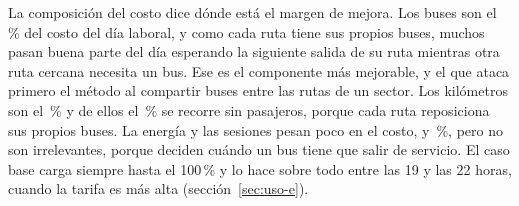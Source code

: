 La composición del costo dice dónde está el margen de mejora. Los buses son el \PctFlotaBaseLaboral\,\% del costo del día laboral, y como cada ruta tiene sus propios buses, muchos pasan buena parte del día esperando la siguiente salida de su ruta mientras otra ruta cercana necesita un bus. Ese es el componente más mejorable, y el que ataca primero el método al compartir buses entre las rutas de un sector. Los kilómetros son el \PctKmBaseLaboral\,\% y de ellos el \PctVacioBaseLaboral\,\% se recorre sin pasajeros, porque cada ruta reposiciona sus propios buses. La energía y las sesiones pesan poco en el costo, \PctEnergiaBaseLaboral{} y \PctSesionesBaseLaboral\,\%, pero no son irrelevantes, porque deciden cuándo un bus tiene que salir de servicio. El caso base carga siempre hasta el 100\,\% y lo hace sobre todo entre las 19 y las 22 horas, cuando la tarifa es más alta (sección~\ref{sec:uso-e}).
